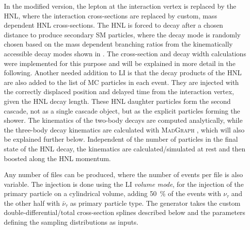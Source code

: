 In the modified version, the lepton at the interaction vertex is replaced by the HNL, where the interaction cross-sections are replaced by custom, mass dependent HNL cross-sections. The HNL is forced to decay after a chosen distance to produce secondary SM particles, where the decay mode is randomly chosen based on the mass dependent branching ratios from the kinematically accessible decay modes shown in . The cross-section and decay width calculations were implemented for this purpose and will be explained in more detail in the following. Another needed addition to LI is that the decay products of the HNL are also added to the list of MC particles in each event. They are injected with the correctly displaced position and delayed time from the interaction vertex, given the HNL decay length. These HNL daughter particles form the second cascade, not as a single cascade object, but as the explicit particles forming the shower. The kinematics of the two-body decays are computed analytically, while the three-body decay kinematics are calculated with \textsc{MadGraph} , which will also be explained further below. Independent of the number of particles in the final state of the HNL decay, the kinematics are calculated/simulated at rest and then boosted along the HNL momentum. 


Any number of files can be produced, where the number of events per file is also variable. The injection is done using the LI \textit{volume mode}, for the injection of the primary particle on a cylindrical volume, adding \SI{50}{\percent} of the events with $\nu_\tau$ and the other half with $\bar{\nu}_\tau$ as primary particle type. The generator takes the custom double-differential/total cross-section splines described below and the parameters defining the sampling distributions as inputs.




